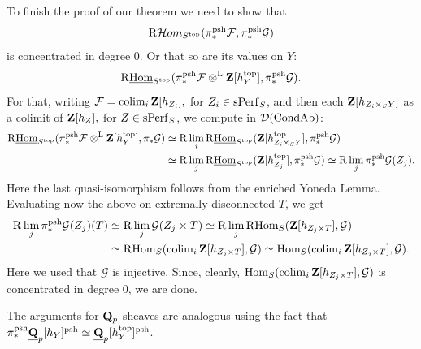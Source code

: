 \documentclass[10pt]{amsart}
\let\cal\mathcal
\theoremstyle{definition}
\theoremstyle{remark}
\newcommand{\colim}{\operatorname{colim} }
\newcommand{\Hom}{{\rm{Hom}} }
\newcommand{\uHom}{\underline{{\rm{Hom}} }}
\newcommand{\Hhom}{{\cal Hom}}
\newcommand{\LL}{\operatorname{L} }
\newcommand{\sff}{{\mathcal{F}}}
\newcommand{\sg}{{\mathcal{G}}}
\newcommand{\sd}{{\mathcal{D}}}
\numberwithin{equation}{section}
\def\R{{\mathrm R}}
\def\Q{{\bf Q}} \def\Z{{\bf Z}}
\numberwithin{equation}{section}
\begin{document}
       To finish the proof of our theorem we need to show that 
   $$
  \R \Hhom_{S^{\rm top}}(\pi^{\rm psh}_{*}\sff,\pi^{\rm psh}_{*}\sg)
   $$
   is concentrated in degree $0$.  Or that so are its values on $Y$:
   $$
     \R \uHom_{S^{\rm top}}(\pi^{\rm psh}_{*}\sff\otimes^{\LL}\Z[h^{\rm top}_Y],\pi^{\rm psh}_{*}\sg).
   $$ 
   For that, writing $\sff=\colim_i\Z[h_{Z_i}], $ for $Z_i\in {\rm sPerf}_S$, and then each $\Z[h_{Z_i\times_S Y}]$ as a colimit of $\Z[h_Z],$ for $ Z\in {\rm sPerf}_S$, we compute in $\sd({\rm CondAb})$:
   \begin{align*}
   \R \uHom_{S^{\rm top}}(\pi^{\rm psh}_{*}\sff \otimes^{\LL}\Z[h^{\rm top}_Y],\pi_{*}\sg) & \simeq \R\lim_i\R \uHom_{S^{\rm top}}(\Z[h^{\rm top}_{Z_i\times_S Y}],\pi^{\rm psh}_{*}\sg)\\
    & \simeq \R\lim_j\R \uHom_{S^{\rm top}}(\Z[h^{\rm top}_{Z_j}],\pi^{\rm psh}_{*}\sg)\simeq \R\lim_j\pi^{\rm psh}_{*}\sg(Z_j).
    \end{align*}
Here the last quasi-isomorphism follows from the enriched Yoneda Lemma.    Evaluating now the above on extremally  disconnected $T$, we get 
    \begin{align*}
    \R\lim_j\pi^{\rm psh}_{*}\sg(Z_j)(T) & \simeq  \R\lim_j\sg(Z_j\times T)  \simeq \R\lim_j\R \Hom_S(\Z[h_{Z_j\times T}],\sg) \\
     & \simeq \R \Hom_S(\colim_i\Z[h_{Z_j\times T}],\sg)\simeq \Hom_S(\colim_i\Z[h_{Z_j\times T}],\sg).
   \end{align*}
   Here we used that  $\sg$ is injective. Since,   clearly, $\Hom_S(\colim_i\Z[h_{Z_j\times T}],\sg)$ 
is concentrated in degree $0$, we are done. 
  
    The arguments for $\Q_p$-sheaves are analogous using the fact that $\pi^{\rm psh}_*\underline{\Q}_p[h_Y]^{\rm psh}\simeq \underline{\Q}_p[h^{\rm top}_Y]^{\rm psh}$.
\end{document}
